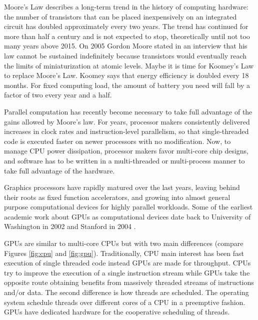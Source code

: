 \documentclass{comjnl}
\begin{document}
Moore's Law describes a long-term trend in the history of computing
hardware: the number of transistors that can be placed inexpensively
on an integrated circuit has doubled approximately every two
years. The trend has continued for more than half a century and is not
expected to stop, theoretically until not too many years above
2015. On 2005 Gordon Moore stated in an interview that his law cannot
be sustained indefinitely because transistors would eventually reach
the limits of miniaturization at atomic levels. Maybe it is time for
Koomey's Law \cite{10.1109/MAHC.2010.28} to replace Moore's
Law. Koomey says that energy efficiency is doubled every 18
months. For fixed computing load, the amount of battery you need will
fall by a factor of two every year and a half.  %

Parallel computation has recently become necessary to take full
advantage of the gains allowed by Moore's law. For years, processor
makers consistently delivered increases in clock rates and
instruction-level parallelism, so that single-threaded code is
executed faster on newer processors with no modification. Now, to
manage CPU power dissipation, processor makers favor multi-core chip
designs, and software has to be written in a multi-threaded or
multi-process manner to take full advantage of the hardware. %

Graphics processors have rapidly matured over the last years, leaving
behind their roots as fixed function accelerators, and growing into
almost general purpose computational devices for highly parallel
workloads. Some of the earliest academic work about GPUs as
computational devices date back to University of Washington in 2002
\cite{Thompson:2002:UMG:774861.774894} and Stanford in 2004
\cite{Buck:2004:BGS:1015706.1015800}.  %

GPUs are similar to multi-core CPUs but with two main differences
(compare Figures \ref{fig:cpu} and \ref{fig:gpu}). Traditionally, CPU
main interest has been fast execution of single threaded code instead
GPUs are made for throughput. CPUs try to improve the execution of a
single instruction stream while GPUs take the opposite route obtaining
benefits from massively threaded streams of instructions and/or
data. The second difference is how threads are scheduled. The
operating system schedule threads over different cores of a CPU in a
preemptive fashion. GPUs have dedicated hardware for the cooperative
scheduling of threads. 
\end{document}
